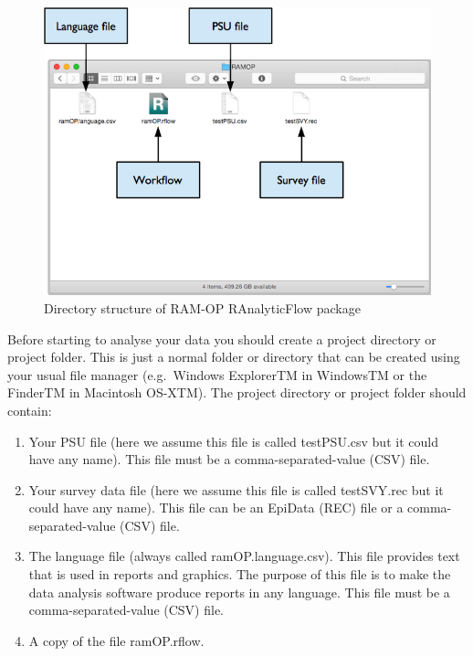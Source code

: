 \documentclass[12pt,a4paper]{book}
\theoremstyle{definition}
\theoremstyle{definition}
\theoremstyle{definition}
\theoremstyle{remark}
\begin{document}
\begin{figure}[H]

{\centering \includegraphics[width=800pt]{figures/dirStructureRAF} 

}

\caption{Directory structure of RAM-OP RAnalyticFlow package}\label{fig:raf1}
\end{figure}

Before starting to analyse your data you should create a project
directory or project folder. This is just a normal folder or directory
that can be created using your usual file manager (e.g.~Windows
ExplorerTM in WindowsTM or the FinderTM in Macintosh OS-XTM). The
project directory or project folder should contain:

\begin{enumerate}
\def\labelenumi{\arabic{enumi}.}
\item
  Your PSU file (here we assume this file is called testPSU.csv but it
  could have any name). This file must be a comma-separated-value (CSV)
  file.
\item
  Your survey data file (here we assume this file is called testSVY.rec
  but it could have any name). This file can be an EpiData (REC) file or
  a comma-separated-value (CSV) file.
\item
  The language file (always called ramOP.language.csv). This file
  provides text that is used in reports and graphics. The purpose of
  this file is to make the data analysis software produce reports in any
  language. This file must be a comma-separated-value (CSV) file.
\item
  A copy of the file ramOP.rflow.
\end{enumerate}
\end{document}
